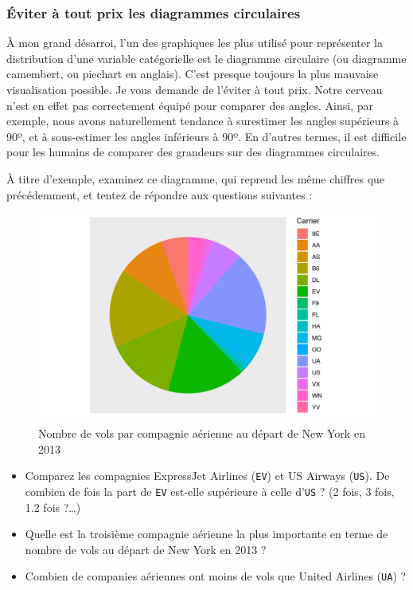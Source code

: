 \documentclass[a4paperpaper,]{article}
\providecommand{\tightlist}{%
  \setlength{\itemsep}{0pt}\setlength{\parskip}{0pt}}
\theoremstyle{definition}
\theoremstyle{definition}
\theoremstyle{definition}
\theoremstyle{remark}
\begin{document}
\subsubsection{Éviter à tout prix les diagrammes
circulaires}\label{eviter-a-tout-prix-les-diagrammes-circulaires}

À mon grand désarroi, l'un des graphiques les plus utilisé pour
représenter la distribution d'une variable catégorielle est le diagramme
circulaire (ou diagramme camembert, ou piechart en anglais). C'est
presque toujours la plus mauvaise visualisation possible. Je vous
demande de l'éviter à tout prix. Notre cerveau n'est en effet pas
correctement équipé pour comparer des angles. Ainsi, par exemple, nous
avons naturellement tendance à surestimer les angles supérieurs à 90º,
et à sous-estimer les angles inférieurs à 90º. En d'autres termes, il
est difficile pour les humains de comparer des grandeurs sur des
diagrammes circulaires.

À titre d'exemple, examinez ce diagramme, qui reprend les même chiffres
que précédemment, et tentez de répondre aux questions suivantes :

\begin{figure}[htpb]

{\centering \includegraphics[width=0.9\linewidth]{figure/piechart-1} 

}

\caption{Nombre de vols par compagnie aérienne au départ de New York en 2013}\label{fig:piechart}
\end{figure}

\begin{itemize}
\tightlist
\item
  Comparez les compagnies ExpressJet Airlines (\texttt{EV}) et US
  Airways (\texttt{US}). De combien de fois la part de \texttt{EV}
  est-elle supérieure à celle d'\texttt{US} ? (2 fois, 3 fois, 1.2 fois
  ?\ldots{})
\item
  Quelle est la troisième compagnie aérienne la plus importante en terme
  de nombre de vols au départ de New York en 2013 ?
\item
  Combien de companies aériennes ont moins de vols que United Airlines
  (\texttt{UA}) ?
\end{itemize}
\end{document}
